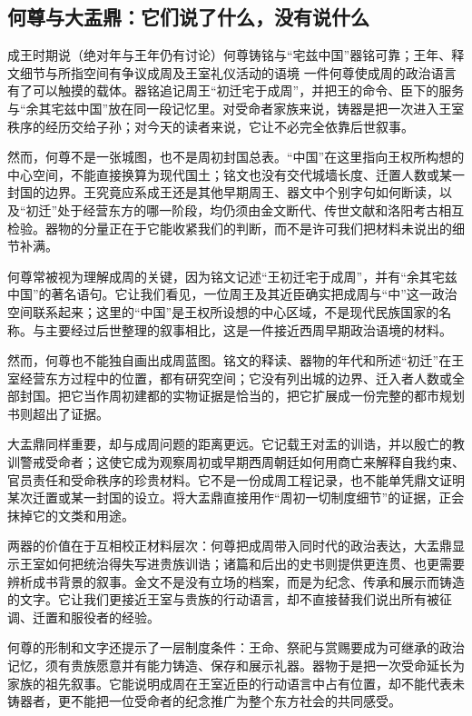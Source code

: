\subsection{何尊与大盂鼎：它们说了什么，没有说什么}

\begin{event}{成王时期说（绝对年与王年仍有讨论）}{何尊铸铭与“宅兹中国”}{器铭可靠；王年、释文细节与所指空间有争议}{成周及王室礼仪活动的语境}
一件何尊使成周的政治语言有了可以触摸的载体。器铭追记周王“初迁宅于成周”，并把王的命令、臣下的服务与“余其宅兹中国”放在同一段记忆里。对受命者家族来说，铸器是把一次进入王室秩序的经历交给子孙；对今天的读者来说，它让不必完全依靠后世叙事。

然而，何尊不是一张城图，也不是周初封国总表。“中国”在这里指向王权所构想的中心空间，不能直接换算为现代国土；铭文也没有交代城墙长度、迁置人数或某一封国的边界。王究竟应系成王还是其他早期周王、器文中个别字句如何断读，以及“初迁”处于经营东方的哪一阶段，均仍须由金文断代、传世文献和洛阳考古相互检验。器物的分量正在于它能收紧我们的判断，而不是许可我们把材料未说出的细节补满。
\end{event}

何尊常被视为理解成周的关键，因为铭文记述“王初迁宅于成周”，并有“余其宅兹中国”的著名语句。它让我们看见，一位周王及其近臣确实把成周与“中”这一政治空间联系起来；这里的“中国”是王权所设想的中心区域，不是现代民族国家的名称。与主要经过后世整理的叙事相比，这是一件接近西周早期政治语境的材料。

然而，何尊也不能独自画出成周蓝图。铭文的释读、器物的年代和所述“初迁”在王室经营东方过程中的位置，都有研究空间；它没有列出城的边界、迁入者人数或全部封国。把它当作周初建都的实物证据是恰当的，把它扩展成一份完整的都市规划书则超出了证据。

大盂鼎同样重要，却与成周问题的距离更远。它记载王对盂的训诰，并以殷亡的教训警戒受命者；这使它成为观察周初或早期西周朝廷如何用商亡来解释自我约束、官员责任和受命秩序的珍贵材料。它不是一份成周工程记录，也不能单凭鼎文证明某次迁置或某一封国的设立。将大盂鼎直接用作“周初一切制度细节”的证据，正会抹掉它的文类和用途。

两器的价值在于互相校正材料层次：何尊把成周带入同时代的政治表达，大盂鼎显示王室如何把统治得失写进贵族训诰；诸篇和后出的史书则提供更连贯、也更需要辨析成书背景的叙事。金文不是没有立场的档案，而是为纪念、传承和展示而铸造的文字。它让我们更接近王室与贵族的行动语言，却不直接替我们说出所有被征调、迁置和服役者的经验。

何尊的形制和文字还提示了一层制度条件：王命、祭祀与赏赐要成为可继承的政治记忆，须有贵族愿意并有能力铸造、保存和展示礼器。器物于是把一次受命延长为家族的祖先叙事。它能说明成周在王室近臣的行动语言中占有位置，却不能代表未铸器者，更不能把一位受命者的纪念推广为整个东方社会的共同感受。

